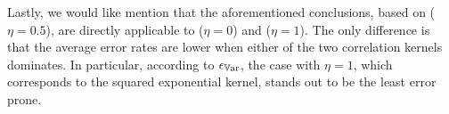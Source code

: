 Lastly, we would like mention that the aforementioned conclusions, based on  ($\eta = 0.5$), are directly applicable to  ($\eta = 0$) and  ($\eta = 1$).
The only difference is that the average error rates are lower when either of the two correlation kernels dominates.
In particular, according to $\epsilon_{\mathbb{V}\text{ar}}$, the case with $\eta = 1$, which corresponds to the squared exponential kernel, stands out to be the least error prone.
